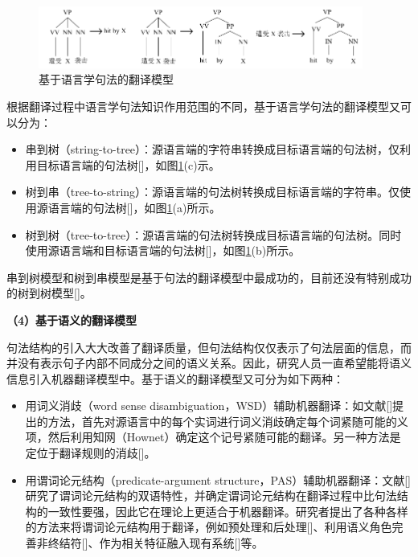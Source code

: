 \begin{figure}[tb]
	\centering
	\includegraphics[width=0.95\textwidth]{Figure/Figure_2_4.pdf}
	\caption{基于语言学句法的翻译模型}
	\label{Fig_smt_syntax}
\end{figure}

根据翻译过程中语言学句法知识作用范围的不同，基于语言学句法的翻译模型又可以分为：

\begin{itemize}
	\item 串到树（string-to-tree）：源语言端的字符串转换成目标语言端的句法树，仅利用目标语言端的句法树[\cite{Yamada:2001,Yamada:2002,Galley:2004,Marcu:2006,Shen:2008}]，如图\ref{Fig_smt_syntax}(c)示。
	
	\item 树到串（tree-to-string）：源语言端的句法树转换成目标语言端的字符串。仅使用源语言端的句法树[\cite{Huang:2006,LiuYang:2006,LiuYang:2007,Mi:2008,liuyangphd:2007,mihaitao:2009}]，如图\ref{Fig_smt_syntax}(a)所示。
	
	\item 树到树（tree-to-tree）：源语言端的句法树转换成目标语言端的句法树。同时使用源语言端和目标语言端的句法树[\cite{Zhang:2008b,LiuYang:2009,Chiang:2010}]，如图\ref{Fig_smt_syntax}(b)所示。
\end{itemize}

串到树模型和树到串模型是基于句法的翻译模型中最成功的，目前还没有特别成功的树到树模型[\cite{zhangjiajun:2011}]。

\textbf{（4）基于语义的翻译模型}

句法结构的引入大大改善了翻译质量，但句法结构仅仅表示了句法层面的信息，而并没有表示句子内部不同成分之间的语义关系。因此，研究人员一直希望能将语义信息引入机器翻译模型中。基于语义的翻译模型又可分为如下两种：

\begin{itemize}
	\item 用词义消歧（word sense disambiguation，WSD）辅助机器翻译：如文献[\cite{Carpuat:2005}]提出的方法，首先对源语言中的每个实词进行词义消歧确定每个词紧随可能的义项，然后利用知网（Hownet）确定这个记号紧随可能的翻译。另一种方法是定位于翻译规则的消歧[\cite{Carpuat:2007,Chan:2007}]。
	
	\item 用谓词论元结构（predicate-argument structure，PAS）辅助机器翻译：文献[\cite{Fung:2006,Fung:2007,Wu:2009}]研究了谓词论元结构的双语特性，并确定谓词论元结构在翻译过程中比句法结构的一致性要强，因此它在理论上更适合于机器翻译。研究者提出了各种各样的方法来将谓词论元结构用于翻译，例如预处理和后处理[\cite{Komachi:2006,Wu:2011,Wu:2009}]、利用语义角色完善非终结符[\cite{LiuGildea:2010,Aziz:2011,Gao:2011}]、作为相关特征融入现有系统[\cite{LiuGildea:2010,Xiong:2012}]等。
\end{itemize}

